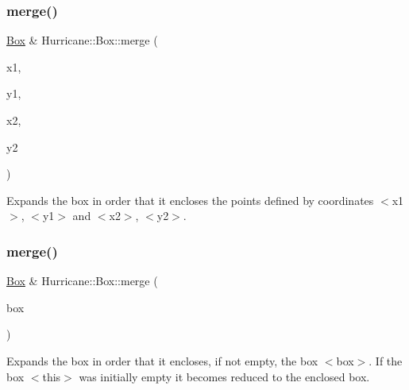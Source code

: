 \subsubsection{\texorpdfstring{merge()}{merge()}\hspace{0.1cm}{\footnotesize\ttfamily [3/4]}}
{\footnotesize\ttfamily \hyperlink{classHurricane_1_1Box}{Box} \& Hurricane\+::\+Box\+::merge (\begin{DoxyParamCaption}\item[{const \hyperlink{group__DbUGroup_ga4fbfa3e8c89347af76c9628ea06c4146}{Db\+U\+::\+Unit} \&}]{x1,  }\item[{const \hyperlink{group__DbUGroup_ga4fbfa3e8c89347af76c9628ea06c4146}{Db\+U\+::\+Unit} \&}]{y1,  }\item[{const \hyperlink{group__DbUGroup_ga4fbfa3e8c89347af76c9628ea06c4146}{Db\+U\+::\+Unit} \&}]{x2,  }\item[{const \hyperlink{group__DbUGroup_ga4fbfa3e8c89347af76c9628ea06c4146}{Db\+U\+::\+Unit} \&}]{y2 }\end{DoxyParamCaption})}

Expands the box in order that it encloses the points defined by coordinates {\ttfamily $<$x1$>$}, {\ttfamily $<$y1$>$} and {\ttfamily $<$x2$>$}, {\ttfamily $<$y2$>$}. \mbox{\label{classHurricane_1_1Box_a0bdfa52a3f5f6639680ba7dbc52c21d7}} 
\subsubsection{\texorpdfstring{merge()}{merge()}\hspace{0.1cm}{\footnotesize\ttfamily [4/4]}}
{\footnotesize\ttfamily \hyperlink{classHurricane_1_1Box}{Box} \& Hurricane\+::\+Box\+::merge (\begin{DoxyParamCaption}\item[{const \hyperlink{classHurricane_1_1Box}{Box} \&}]{box }\end{DoxyParamCaption})}

Expands the box in order that it encloses, if not empty, the box {\ttfamily $<$box$>$}. If the box {\ttfamily $<$this$>$} was initially empty it becomes reduced to the enclosed box. \mbox{\label{classHurricane_1_1Box_aa689be4b37c83412f3dc95fc23c82156}} 
